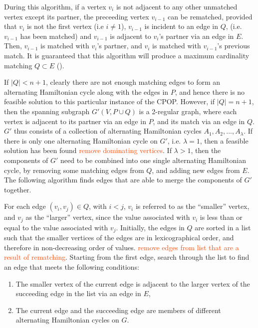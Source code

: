 \documentclass[oribibl]{llncs}
\begin{document}
During this algorithm, if a vertex $v_i$ is not adjacent to any other unmatched vertex except its partner, the preceeding vertex $v_{i-1}$ can be rematched, provided that $v_i$ is not the first vertex (i.e $i \neq 1$), $v_{i-1}$ is incident to an edge in $Q$, (i.e. $v_{i-1}$ has been matched) and $v_{i-1}$ is adjacent to $v_i$'s partner via an edge in $E$. Then, $v_{i-1}$ is matched with $v_i$'s partner, and $v_i$ is matched with $v_{i-1}$'s previous match. It is guaranteed that this algorithm will produce a maximum cardinality matching $Q \subset E$ (\citealp{becker2010}).

If $|Q| < n+1$, clearly there are not enough matching edges to form an alternating Hamiltonian cycle along with the edges in $P$, and hence there is no feasible solution to this particular instance of the CPOP. However, if $|Q| = n+1$, then the spanning subgraph $G'(V, P \cup Q)$ is a 2-regular graph, where each vertex is adjacent to its partner via an edge in $P$, and its match via an edge in $Q$. $G'$ thus consists of a collection of alternating Hamiltonian cycles $A_1, A_2, ..., A_{\lambda}$. If there is only one alternating Hamiltonian cycle on $G'$, i.e. $\lambda = 1$, then a feasible solution has been found \textcolor{OrangeRed}{remove dominating vertices}. If $\lambda > 1$, then the components of $G'$ need to be combined into one single alternating Hamiltonian cycle, by removing some matching edges from $Q$, and adding new edges from $E$. The following algorithm finds edges that are able to merge the components of $G'$ together.

For each edge $(v_i, v_j) \in Q$, with $i < j$, $v_i$ is referred to as the ``smaller'' vertex, and $v_j$ as the ``larger'' vertex, since the value associated with $v_i$ is less than or equal to the value associated with $v_j$. Initially, the edges in $Q$ are sorted in a list such that the smaller vertices of the edges are in lexicographical order, and therefore in non-decreasing order of values. \textcolor{OrangeRed}{remove edges from list that are a result of rematching}. Starting from the first edge, search through the list to find an edge that meets the following conditions:
\begin{enumerate}
	\item The smaller vertex of the current edge is adjacent to the larger vertex of the succeeding edge in the list via an edge in $E$,
	\item The current edge and the succeeding edge are members of different alternating Hamiltonian cycles on $G$.
\end{enumerate}
\end{document}
